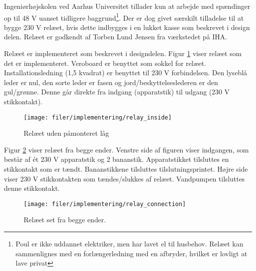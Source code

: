 Ingeniørhøjskolen ved Aarhus Universitet tillader kun at arbejde med spændinger op til 48 V uanset tidligere baggrund\footnote{Poul er ikke uddannet elektriker, men har lavet el til husbehov. Relæet kan sammenlignes med en forlængerledning med en afbryder, hvilket er lovligt at lave privat}. Der er dog givet særskilt tilladelse til at bygge 230 V relæet, hvis dette indbygges i en lukket kasse som beskrevet i design delen. Relæet er godkendt af Torben Lund Jensen fra værkstedet på IHA.

Relæet er implementeret som beskrevet i designdelen. Figur \ref{lab:Relay_inside} viser relæet som det er implementeret. Veroboard er benyttet som sokkel for relæet. Installationsledning (1,5 kvadrat) er benyttet til 230 V forbindelsen.
Den lyseblå leder er nul, den sorte leder er fasen  og jord/beskyttelseslederen er
den gul/grønne. Denne går direkte fra indgang (apparatstik) til udgang (230 V stikkontakt).
  


\begin{figure}[htb]
\centering
{\texttt{[image: filer/implementering/relay\_inside]}}
\caption{Relæet uden påmonteret låg}
\label{lab:Relay_inside}
\end{figure}

Figur \ref{lab:Relay_connection} viser relæet fra begge ender. Venstre side af figuren viser indgangen, som består af ét 230 V apparatstik og 2 bananstik. Apparatstikket tilsluttes en stikkontakt som er tændt. Bananstikkene tilsluttes tilslutningsprintet. Højre side viser 230 V stikkontakten som tændes/slukkes af relæet. Vandpumpen tilsluttes denne stikkontakt.

\begin{figure}[htb]
\centering
{\texttt{[image: filer/implementering/relay\_connection]}}
\caption{Relæet set fra begge ender.}
\label{lab:Relay_connection}
\end{figure}
